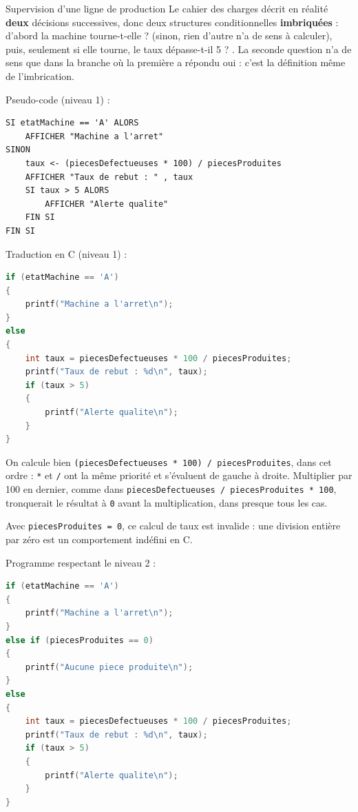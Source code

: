 \begin{UPSTIprofOnlyEnv}
    \begin{UPSTIcorrectionP}{Supervision d'une ligne de production}
        Le cahier des charges décrit en réalité \textbf{deux} décisions successives, donc deux structures conditionnelles \textbf{imbriquées} : d'abord \og la machine tourne-t-elle ? \fg{} (sinon, rien d'autre n'a de sens à calculer), puis, seulement si elle tourne, \og le taux dépasse-t-il 5 ? \fg. La seconde question n'a de sens que dans la branche où la première a répondu \og oui \fg{} : c'est la définition même de l'imbrication.

        Pseudo-code (niveau 1) :
        \begin{verbatim}
SI etatMachine == 'A' ALORS
    AFFICHER "Machine a l'arret"
SINON
    taux <- (piecesDefectueuses * 100) / piecesProduites
    AFFICHER "Taux de rebut : " , taux
    SI taux > 5 ALORS
        AFFICHER "Alerte qualite"
    FIN SI
FIN SI
        \end{verbatim}

        Traduction en C (niveau 1) :
        \begin{lstlisting}[language=C]
if (etatMachine == 'A')
{
    printf("Machine a l'arret\n");
}
else
{
    int taux = piecesDefectueuses * 100 / piecesProduites;
    printf("Taux de rebut : %d\n", taux);
    if (taux > 5)
    {
        printf("Alerte qualite\n");
    }
}
        \end{lstlisting}

        On calcule bien \texttt{(piecesDefectueuses * 100) / piecesProduites}, dans cet ordre : \texttt{*} et \texttt{/} ont la même priorité et s'évaluent de gauche à droite. Multiplier par 100 en dernier, comme dans \texttt{piecesDefectueuses / piecesProduites * 100}, tronquerait le résultat à \texttt{0} avant la multiplication, dans presque tous les cas.

        Avec \texttt{piecesProduites = 0}, ce calcul de taux est invalide : une division entière par zéro est un comportement indéfini en C.

        Programme respectant le niveau 2 :
        \begin{lstlisting}[language=C]
if (etatMachine == 'A')
{
    printf("Machine a l'arret\n");
}
else if (piecesProduites == 0)
{
    printf("Aucune piece produite\n");
}
else
{
    int taux = piecesDefectueuses * 100 / piecesProduites;
    printf("Taux de rebut : %d\n", taux);
    if (taux > 5)
    {
        printf("Alerte qualite\n");
    }
}
        \end{lstlisting}


\end{UPSTIcorrectionP}
\end{UPSTIprofOnlyEnv}
